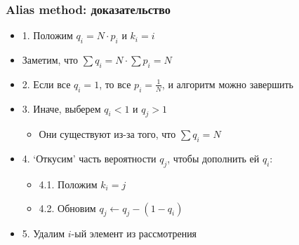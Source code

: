 \documentclass[10pt]{beamer}
\begin{document}
\begin{frame}
\frametitle{Alias method: доказательство}
\begin{itemize}
\item 1. Положим \begin{math}q_i = N \cdot p_i\end{math} и \begin{math}k_i = i\end{math}
\pause
\item Заметим, что \begin{math}\sum q_i = N \cdot \sum p_i = N\end{math}
\pause
\item 2. Если все \begin{math}q_i = 1\end{math}, то все \begin{math}p_i = \frac{1}{N}\end{math}, и алгоритм можно завершить
\pause
\item 3. Иначе, выберем \begin{math}q_i < 1\end{math} и \begin{math}q_j > 1\end{math}
\pause
\begin{itemize}
\item Они существуют из-за того, что \begin{math}\sum q_i = N\end{math}
\end{itemize}
\pause
\item 4. `Откусим' часть вероятности \begin{math}q_j\end{math}, чтобы дополнить ей \begin{math}q_i\end{math}:
\pause
\begin{itemize}
\item 4.1. Положим \begin{math}k_i = j\end{math}
\pause
\item 4.2. Обновим \begin{math}q_j \leftarrow q_j - (1 - q_i)\end{math}
\end{itemize}
\pause
\item 5. Удалим \begin{math}i\end{math}-ый элемент из рассмотрения

\end{itemize}
\end{frame}
\end{document}
